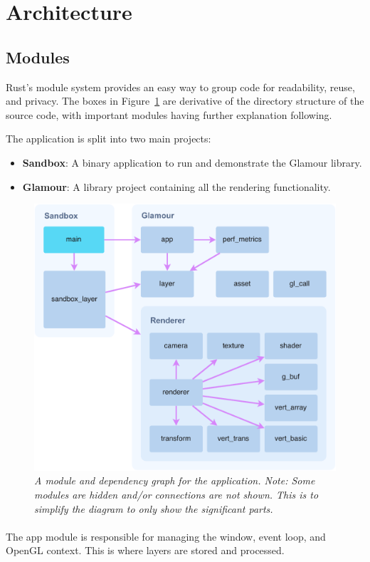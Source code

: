 \section{Architecture}\label{sec:architecture}

\subsection{Modules}
Rust's module system provides an easy way to group code for readability, reuse, and privacy.
The boxes in Figure~\ref{fig:module-graph} are derivative of the directory structure of the source code, with important modules having further explanation following.

The application is split into two main projects:
\begin{itemize}
  \item \textbf{Sandbox}: A binary application to run and demonstrate the Glamour library.
  \item \textbf{Glamour}: A library project containing all the rendering functionality.
\end{itemize}

\begin{figure}[h!]
  \begin{center}
    \includegraphics[width=0.7\columnwidth]{../module-graph.pdf}
  \end{center}
  \caption[Module graph]{
    \emph{
      A module and dependency graph for the application.
      Note: Some modules are hidden and/or connections are not shown.
      This is to simplify the diagram to only show the significant parts.
    }
  }\label{fig:module-graph}
\end{figure}

\paragraph{}
The app module is responsible for managing the window, event loop, and OpenGL context.
This is where layers are stored and processed.

